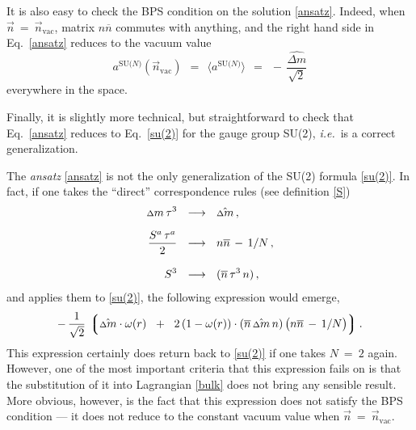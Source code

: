 \documentclass[12pt]{article}
\def\beq{\begin{equation}}
\def\eeq{\end{equation}}
\newcommand{\ov}{\overline}
\newcommand{\lgr}{\left\lgroup}
\newcommand{\rgr}{\right\rgroup}
\newcommand{\aN}{a^\text{SU($N$)}}
\newcommand{\nbar}{\ov{n}}
\newcommand{\nnbar}{n\ov{n}}
\newcommand{\dm}{\hat{{\scriptstyle \Delta} m}}
\newcommand{\deltam}{{\scriptstyle \Delta} m}
\newcommand{\nvac}{\vec{n}{}_\text{vac}}
\newcommand{\ie}{{\it i.e.}~}
\newcommand{\ansatz}{{\it ansatz} }
\begin{document}
	It is also easy to check the BPS condition on the solution \eqref{ansatz}.
	Indeed, when $ \vec{n} ~=~ \nvac $, matrix $ \nnbar $ commutes with anything,
	and the right hand side in Eq.~\eqref{ansatz} reduces to the vacuum value
\beq
	\aN (\nvac)    ~~=~~    \langle \aN \rangle    ~~=~~    -\, \frac{\dm}{\sqrt{2}}
\eeq
	everywhere in the space.

	Finally, it is slightly more technical, but straightforward to check that Eq.~\eqref{ansatz}
	reduces to Eq.~\eqref{su(2)} for the gauge group SU(2), \ie is a correct generalization.

	The \ansatz \eqref{ansatz} is not the only generalization of the SU(2) formula \eqref{su(2)}.
	In fact, if one takes the ``direct'' correspondence rules (see definition \eqref{S})
\begin{align}
%
\notag
	\deltam\, \tau^3    & ~~\longrightarrow~~    \dm\,,\\[2mm]
%
	\frac{S^a\, \tau^a}{2}    & ~~\longrightarrow~~    \nnbar \,-\, 1/N \,,\\[3mm]
%
\notag
	S^3    & ~~\longrightarrow~~     (\nbar\, \tau^3\, n)\,,
\end{align}
	and applies them to \eqref{su(2)}, the following expression would emerge,
\[
	-\, \frac{1}{\sqrt{2}}\, \lgr  \dm \cdot \omega(r)  \;~+~\;  
	2\, ( 1 - \omega(r) ) \cdot (\nbar\, \dm\, n) \, \big( \nnbar \,-\, 1/N \big) \rgr.
\]
	This expression certainly does return back to \eqref{su(2)} if one takes $ N ~=~ 2 $ again.
	However, one of the most important criteria that this expression fails on is that 
	the substitution of it into Lagrangian \eqref{bulk} does not bring any sensible result.
	More obvious, however, is the fact that this expression does not satisfy the BPS condition ---
	it does not reduce to the constant vacuum value when $ \vec{n} ~=~ \nvac $.
\end{document}
